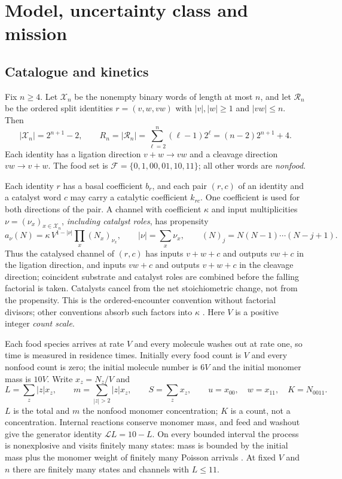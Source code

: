 \documentclass[11pt,letterpaper]{article}
\theoremstyle{plain}
\theoremstyle{definition}
\theoremstyle{remark}
\numberwithin{equation}{section}
\newcommand{\cX}{\mathcal X}
\newcommand{\cR}{\mathcal R}
\newcommand{\cF}{\mathcal F}
\newcommand{\cL}{\mathcal L}
\begin{document}
\section{Model, uncertainty class and mission}\label{sec:model}

\subsection{Catalogue and kinetics}
Fix $n\ge4$. Let $\cX_n$ be the nonempty binary words of length at most $n$, and let $\cR_n$ be the ordered split identities $r=(v,w,vw)$ with $|v|,|w|\ge1$ and $|vw|\le n$. Then
\begin{equation}\label{eq:catalogue}
 |\cX_n|=2^{n+1}-2,\qquad R_n=|\cR_n|=\sum_{\ell=2}^n(\ell-1)2^\ell=(n-2)2^{n+1}+4 .
\end{equation}
Each identity has a ligation direction $v+w\to vw$ and a cleavage direction $vw\to v+w$. The food set is $\cF=\{0,1,00,01,10,11\}$; all other words are \emph{nonfood}.

Each identity $r$ has a basal coefficient $b_r$, and each pair $(r,c)$ of an identity and a catalyst word $c$ may carry a catalytic coefficient $k_{rc}$. One coefficient is used for both directions of the pair. A channel with coefficient $\kappa$ and input multiplicities $\nu=(\nu_x)_{x\in\cX_n}$, \emph{including catalyst roles}, has propensity
\begin{equation}\label{eq:rate}
 a_\nu(N)=\kappa\,V^{1-|\nu|}\prod_x(N_x)_{\nu_x},\qquad |\nu|=\sum_x\nu_x,\qquad (N)_j=N(N-1)\cdots(N-j+1).
\end{equation}
Thus the catalysed channel of $(r,c)$ has inputs $v+w+c$ and outputs $vw+c$ in the ligation direction, and inputs $vw+c$ and outputs $v+w+c$ in the cleavage direction; coincident substrate and catalyst roles are combined before the falling factorial is taken. Catalysts cancel from the net stoichiometric change, not from the propensity. This is the ordered-encounter convention without factorial divisors; other conventions absorb such factors into $\kappa$ \cite{anderson2011continuous,gillespie1977exact}. Here $V$ is a positive integer \emph{count scale}.

Each food species arrives at rate $V$ and every molecule washes out at rate one, so time is measured in residence times. Initially every food count is $V$ and every nonfood count is zero; the initial molecule number is $6V$ and the initial monomer mass is $10V$. Write $x_z=N_z/V$ and
\begin{equation}\label{eq:coords}
 L=\sum_z|z|x_z,\qquad m=\sum_{|z|>2}|z|x_z,\qquad S=\sum_zx_z,\qquad u=x_{00},\quad w=x_{11},\quad K=N_{0011}.
\end{equation}
$L$ is the total and $m$ the nonfood monomer concentration; $K$ is a count, not a concentration. Internal reactions conserve monomer mass, and feed and washout give the generator identity $\cL L=10-L$. On every bounded interval the process is nonexplosive and visits finitely many states: mass is bounded by the initial mass plus the monomer weight of finitely many Poisson arrivals \cite{anderson2011continuous,norris1997markov}. At fixed $V$ and $n$ there are finitely many states and channels with $L\le11$.
\end{document}
